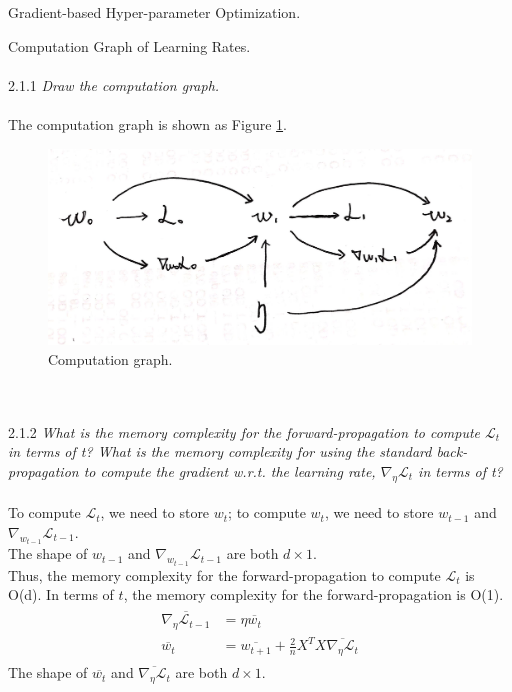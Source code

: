 \documentclass{myhw}
\begin{document}
\begin{homeworkProblem}
Gradient-based Hyper-parameter Optimization.
\begin{homeworkSection}
Computation Graph of Learning Rates. \\ \\
2.1.1 \emph{Draw the computation graph.} \\ \\
The computation graph is shown as Figure \ref{fig:2.1.1}.
\begin{figure}[h]
  \centering
  \includegraphics[width=.6\textwidth]{q2.1.1.jpeg} 
  \caption{Computation graph. }
  \label{fig:2.1.1}
\end{figure}
\\ \\
2.1.2 \emph{What is the memory complexity for the forward-propagation to compute $\mathcal{L}_t$ in terms of t? What is the memory complexity for using the standard back-propagation to compute the gradient w.r.t. the learning rate, $\nabla_{\eta} \mathcal{L}_t$ in terms of t?} \\ \\
To compute $\mathcal{L}_t$, we need to store $w_t$; 
to compute $w_t$, we need to store $w_{t-1}$ and $\nabla_{w_{t-1}} \mathcal{L}_{t-1}$. \\
The shape of $w_{t-1}$ and $\nabla_{w_{t-1}} \mathcal{L}_{t-1}$ are both $d \times 1$.\\
Thus, the memory complexity for the forward-propagation to compute $\mathcal{L}_t$ is O(d). In terms of $t$, the memory complexity for the forward-propagation is O(1). 
\begin{gather*}
\begin{aligned}
\overline{\nabla_{\eta} \mathcal{L}_{t-1}} &= \eta \overline{w_t} \\
\overline{w_t} &= \overline{w_{t+1}} + \frac{2}{n} X^T X \overline{\nabla_{\eta} \mathcal{L}_t}
\end{aligned}
\end{gather*}
The shape of $\overline{w_t}$ and $\overline{\nabla_{\eta} \mathcal{L}_t}$ are both $d \times 1$.\\

\end{homeworkSection}
\end{homeworkProblem}
\end{document}
